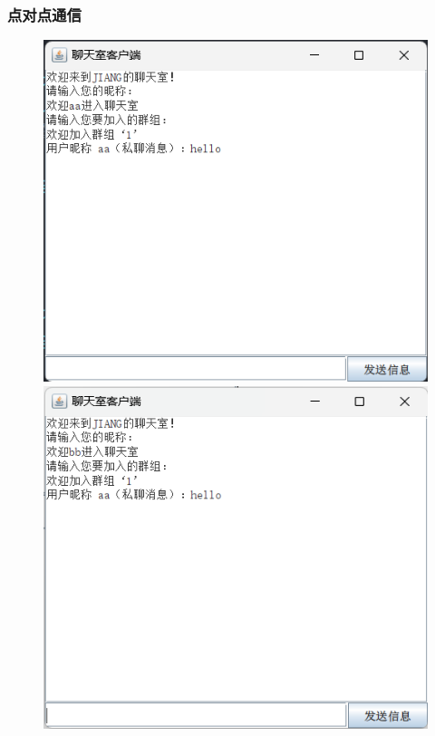 \documentclass[UTF8,12pt]{article}
\begin{document}
\subsubsection{点对点通信}
\begin{figure}[htbp]
    \begin{minipage}{0.49\linewidth}
		\centering
		\includegraphics[width=0.9\linewidth]{img/8.png}
	\end{minipage}
	\begin{minipage}{0.49\linewidth}
		\centering
		\includegraphics[width=0.9\linewidth]{img/9.png}
	\end{minipage}
\end{figure}
\end{document}
